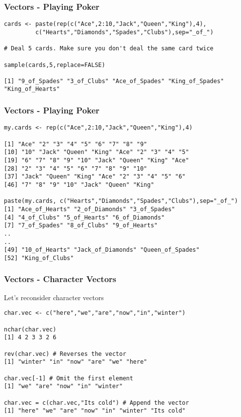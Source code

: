 \documentclass{beamer}
\begin{document}
%
\begin{frame}[fragile]
\frametitle{Vectors - Playing Poker}
\footnotesize
\begin{verbatim}
cards <- paste(rep(c("Ace",2:10,"Jack","Queen","King"),4),
         c("Hearts","Diamonds","Spades","Clubs"),sep="_of_")

# Deal 5 cards. Make sure you don't deal the same card twice

sample(cards,5,replace=FALSE)

[1] "9_of_Spades" "3_of_Clubs" "Ace_of_Spades" "King_of_Spades"
"King_of_Hearts"

\end{verbatim}
\end{frame}

%
\begin{frame}[fragile]
\frametitle{Vectors - Playing Poker}
\footnotesize
\begin{verbatim}
my.cards <- rep(c("Ace",2:10,"Jack","Queen","King"),4)

[1] "Ace" "2" "3" "4" "5" "6" "7" "8" "9"
[10] "10" "Jack" "Queen" "King" "Ace" "2" "3" "4" "5"
[19] "6" "7" "8" "9" "10" "Jack" "Queen" "King" "Ace"
[28] "2" "3" "4" "5" "6" "7" "8" "9" "10"
[37] "Jack" "Queen" "King" "Ace" "2" "3" "4" "5" "6"
[46] "7" "8" "9" "10" "Jack" "Queen" "King"

paste(my.cards, c("Hearts","Diamonds","Spades","Clubs"),sep="_of_")
[1] "Ace_of_Hearts" "2_of_Diamonds" "3_of_Spades"
[4] "4_of_Clubs" "5_of_Hearts" "6_of_Diamonds"
[7] "7_of_Spades" "8_of_Clubs" "9_of_Hearts"
..
..
[49] "10_of_Hearts" "Jack_of_Diamonds" "Queen_of_Spades"
[52] "King_of_Clubs"
\end{verbatim}
\end{frame}

%
\begin{frame}[fragile]
\frametitle{Vectors - Character Vectors}
Let's reconsider character vectors
\footnotesize
\begin{verbatim}
char.vec <- c("here","we","are","now","in","winter")

nchar(char.vec)
[1] 4 2 3 3 2 6

rev(char.vec) # Reverses the vector
[1] "winter" "in" "now" "are" "we" "here"

char.vec[-1] # Omit the first element
[1] "we" "are" "now" "in" "winter"

char.vec = c(char.vec,"Its cold") # Append the vector
[1] "here" "we" "are" "now" "in" "winter" "Its cold"
\end{verbatim}
\end{frame}
\end{document}
